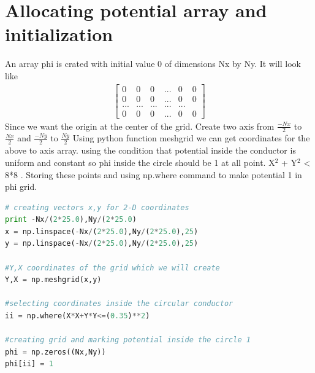 \documentclass[a4paper]{article}
\begin{document}
\section{Allocating potential array and initialization}
An array phi is crated with initial value 0 of dimensions Nx by Ny. It will look like
\begin{gather}
 \begin{bmatrix} 0 & 0 & 0 & ... & 0 & 0 \\  0 & 0 & 0 & ... & 0 & 0 \\ ... & ... & ...& ...& ... \\0 & 0 & 0 & ... & 0 & 0 \end{bmatrix}
 \end{gather}
Since we want the origin at the center of the grid.  Create two axis from $\frac{-Nx}{2}$ to $\frac{Nx}{2}$ and $\frac{-Ny}{2}$ to $\frac{Ny}{2}$
Using python function meshgrid we can get coordinates for the above to axis array.
using the condition that potential inside the conductor is uniform and constant so phi inside the circle should be 1 at all point.
X$^{2}$ + Y$^{2}$ < 8*8 .
Storing these points and using np.where command to make potential 1 in phi grid.
\begin{lstlisting}[language=Python]
# creating vectors x,y for 2-D coordinates
print -Nx/(2*25.0),Ny/(2*25.0)
x = np.linspace(-Nx/(2*25.0),Ny/(2*25.0),25)
y = np.linspace(-Nx/(2*25.0),Ny/(2*25.0),25)

#Y,X coordinates of the grid which we will create
Y,X = np.meshgrid(x,y)

#selecting coordinates inside the circular conductor
ii = np.where(X*X+Y*Y<=(0.35)**2)

#creating grid and marking potential inside the circle 1
phi = np.zeros((Nx,Ny))
phi[ii] = 1

\end{lstlisting}
\end{document}
